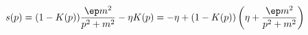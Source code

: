 \begin{equation}
s(p) = (1 - K(p)) \frac{\ep m^2}{p^2 + m^2} - \eta K(p) = - \eta + (1
- K(p)) \left( \eta + \frac{\ep m^2}{p^2 + m^2} \right) \label{choice}
\end{equation}

